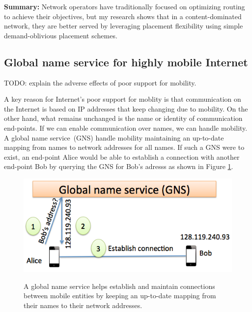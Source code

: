 \textbf{Summary:} Network operators have traditionally focused on optimizing routing to achieve their objectives, but my research shows that in a content-dominated network, they are better served by leveraging placement flexibility using simple demand-oblivious placement schemes.

\subsection{Global name service for highly mobile Internet}

TODO: explain the adverse effects of poor support for mobility.

A key reason for Internet's poor support for moblity is that communication on the Internet is based on IP addresses that keep changing due to mobility. On the other hand, what remains unchanged is the name or identity of communication end-points. If we can enable communication over names, we can handle mobility. A  global name service (GNS) handle mobility maintaining an up-to-date mapping from names to network addresses for all names. If such a GNS were to exist, an end-point Alice would be able to establish a connection with another end-point Bob by querying the GNS for Bob's adresss as shown in Figure \ref{fig:gns-example}. 

\begin{figure}
	\centering
	\includegraphics[scale=0.4]{fig/gns-example.png}
	\label{fig:gns-example}
	\caption{A global name service helps establish and maintain connections between mobile entities by keeping an up-to-date mapping from their names to their network addresses.}
\end{figure}

